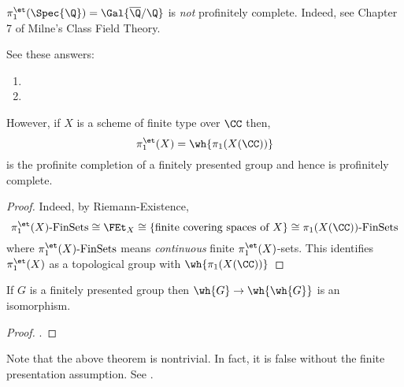 \documentclass[12pt]{article}
\begin{document}
\begin{example}
$\pi_1^{\et}(\Spec{\Q}) = \Gal{\overline{\Q}/\Q}$ is \textit{not} profinitely complete. Indeed, see Chapter 7 of Milne's Class Field Theory.
\end{example}

\begin{rmk}
See these answers:
\begin{enumerate}
\item {}

\item {}
\end{enumerate}
\end{rmk}

\begin{prop}
However, if $X$ is a scheme of finite type over $\CC$ then,
\[ \pi_1^{\et}(X) = \wh{\pi_1(X(\CC))} \]
is the profinite completion of a finitely presented group and hence is profinitely complete.
\end{prop}

\begin{proof}
Indeed, by Riemann-Existence,
\[ \pi_1^{\et}(X)\text{-FinSets} \cong \FEt_X \cong \{ \text{finite covering spaces of } X \} \cong \pi_1(X(\CC))\text{-FinSets} \]
where $\pi_1^{\et}(X)\text{-FinSets}$ means \textit{continuous} finite $\pi_1^{\et}(X)$-sets. This identifies $\pi_1^{\et}(X)$ as a topological group with $\wh{\pi_1(X(\CC))}$
\end{proof}

\begin{lemma}
If $G$ is a finitely presented group then $\wh{G} \to \wh{\wh{G}}$ is an isomorphism.
\end{lemma}

\begin{proof}
.
\end{proof}

\begin{rmk}
Note that the above theorem is nontrivial. In fact, it is false without the finite presentation assumption. See .
\end{rmk}
\end{document}
